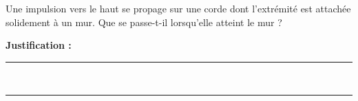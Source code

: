 Une impulsion vers le haut se propage sur une corde dont l'extrémité est attachée solidement à un mur. Que se passe-t-il lorsqu'elle atteint le mur ?

\choices

\noindent\textbf{Justification :} \hrulefill \\[2.5ex]
\rule{\linewidth}{0.4pt} \\[2.5ex]
\rule{\linewidth}{0.4pt}
\vfill
